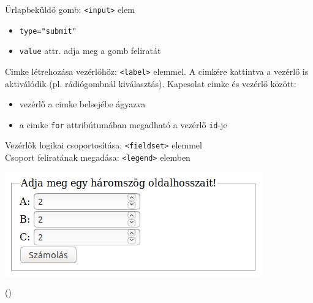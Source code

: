 \begin{frame}
  Űrlapbeküldő gomb: \texttt{<input>} elem
  \begin{itemize}
    \item \texttt{type="submit"}
    \item \texttt{value} attr. adja meg a gomb feliratát
  \end{itemize}
  \vfill
  Cimke létrehozása vezérlőhöz: \texttt{<label>} elemmel. A 
  cimkére kattintva a vezérlő is aktiválódik (pl. rádiógombnál 
  kiválasztás). Kapcsolat cimke és 
  vezérlő között:
  \begin{itemize}
    \item vezérlő a cimke belsejébe ágyazva
    \item a cimke \texttt{for} attribútumában megadható a vezérlő 
    \texttt{id}-je
  \end{itemize}
\end{frame}

\begin{frame}
  Vezérlők logikai csoportosítása: \texttt{<fieldset>} elemmel\\
  Csoport feliratának megadása: \texttt{<legend>} elemben
  \vfill
  \begin{center}
    \includegraphics[width=.5\textwidth]{urlap1.png}
  \end{center}
\end{frame}

\begin{frame}
  \begin{exampleblock}{ 
  ()}
    \footnotesize
    
  \end{exampleblock}
\end{frame}

